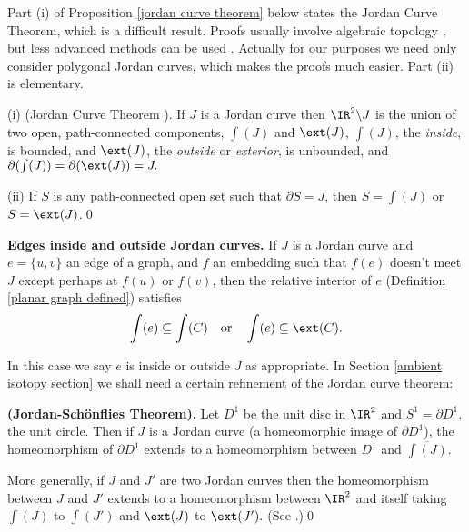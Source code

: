 Part (i) of Proposition \ref{jordan curve theorem} below
states the Jordan Curve Theorem, which is a difficult result.
Proofs usually involve
algebraic topology \cite{greenberg}, but less advanced
methods can be used
\cite{moise,stillwell}.
Actually for our purposes we need only consider polygonal
Jordan curves, which makes the proofs much easier.
Part (ii) is elementary.

\begin{proposition}
\label{jordan curve theorem} {\rm (i)} (Jordan Curve Theorem {\rm \cite{greenberg,moise,stillwell}}).
If $J$ is a Jordan curve
then $\IR^2 \backslash J$ is the union of two
open, path-connected components, 
$\int(J)$ and $\ext(J)$,
$\int(J)$, the {\em inside}, is bounded, and $\ext(J)$, the {\em outside}
or {\em exterior},
is unbounded, and $\partial (\int(J)) = \partial (\ext(J)) = J.$

{\rm (ii)} If $S$ is any path-connected open set such that
$\partial S = J$, then $S=\int(J)$ or $S=\ext(J)$.\qed
\end{proposition}


\numpara
\label{edges inside and outside Jordan curves} {\bf Edges inside and outside Jordan curves.}
If $J$ is a Jordan curve and $e=\{u,v\}$ an edge of a
graph, and $f$ an embedding such that $f(e)$ doesn't meet $J$
except perhaps at $f(u)$ or $f(v)$, then
the relative interior of $e$ (Definition
\ref{planar graph defined}) satisfies
$$ \int(e) \subseteq \int(C)
\quad\text{or}\quad
\int(e) \subseteq \ext(C).$$

In this case we say $e$ is inside or outside $J$ as appropriate.
In Section \ref{ambient isotopy section}
we shall need a certain refinement of the Jordan curve theorem:

\begin{proposition}
\label{schoenflies theorem} {\bf (Jordan-Sch\"onflies Theorem).}
Let $D^1$ be the unit disc in $\IR^2$ and $S^1 = \partial D^1,$
the unit circle.  Then if $J$ is a Jordan curve (a homeomorphic
image of $\partial D^1$), the homeomorphism of $\partial D^1$
extends to a homeomorphism between $D^1$ and $\overline{\int(J)}.$

More generally, if $J$ and $J'$ are two Jordan curves then
the homeomorphism between $J$ and $J'$ extends to a homeomorphism
between $\IR^2$ and itself taking $\int(J)$ to $\int(J')$
and $\ext(J)$ to $\ext(J').$
(See {\rm \cite{moise}}.)\qed
\end{proposition}


